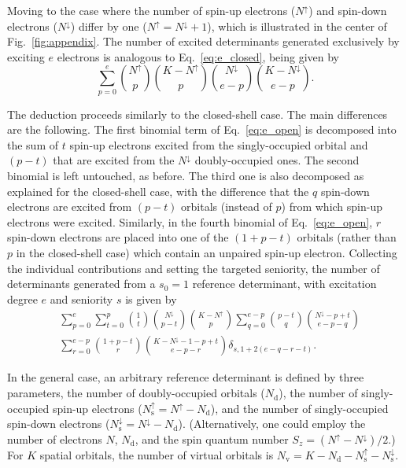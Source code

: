 \documentclass[aip,jcp,reprint,noshowkeys,superscriptaddress]{revtex4-1}
\newcommand{\Na}{N^{\uparrow}}
\newcommand{\Nb}{N^{\downarrow}}
\newcommand{\Nd}{N_\text{d}}
\newcommand{\Nv}{N_\text{v}}
\newcommand{\Nas}{N_\text{s}^{\uparrow}}
\newcommand{\Nbs}{N_\text{s}^{\downarrow}}
\newcommand{\Ndet}{N_\text{det}}
\begin{document}
Moving to the case where the number of spin-up electrons ($\Na$) and spin-down electrons ($\Nb$) differ by one ($\Na=\Nb+1$), which is illustrated in the center of Fig.~\ref{fig:appendix}.
The number of excited determinants generated exclusively by exciting $e$ electrons %
is analogous to Eq.~\eqref{eq:e_closed}, being given by
\begin{equation}
\sum_{p=0}^{e} 
\binom{\Na}{p} \binom{K-\Na}{p} \binom{\Nb}{e-p} \binom{K-\Nb}{e-p}.
\label{eq:e_open}
\end{equation}

The deduction proceeds similarly to the closed-shell case. 
The main differences are the following.
The first binomial term of Eq.~\eqref{eq:e_open} is decomposed into the sum of $t$ spin-up electrons excited from the singly-occupied orbital and $(p-t)$ that are excited from the $\Nb$ doubly-occupied ones.
The second binomial is left untouched, as before.
The third one is also decomposed as explained for the closed-shell case, with the difference that the $q$ spin-down electrons are excited from $(p-t)$ orbitals (instead of $p$) 
from which spin-up electrons were excited. 
Similarly, in the fourth binomial of Eq.~\eqref{eq:e_open}, $r$ spin-down electrons are placed into one of the $(1+p-t)$ orbitals (rather than $p$ in the closed-shell case) which contain an unpaired spin-up electron.
Collecting the individual contributions and setting the targeted seniority,
the number of determinants generated from a $s_0=1$ reference determinant, with excitation degree $e$ and seniority $s$ is given by
\begin{equation}
\begin{split}
	& \sum_{p=0}^{e} 
	\sum_{t=0}^{p} \binom{1}{t} \binom{\Nb}{p-t} 
	\binom{K-\Na}{p} 
	\sum_{q=0}^{e-p} \binom{p-t}{q} \binom{\Nb-p+t}{e-p-q} \\
	& \sum_{r=0}^{e-p} \binom{1+p-t}{r} \binom{K-\Nb-1-p+t}{e-p-r}
 	\delta_{s,1+2(e-q-r-t)}.
\label{eq:det_2}
\end{split}
\end{equation}

In the general case, an arbitrary reference determinant is defined by three parameters, the number of doubly-occupied orbitals ($\Nd$),
the number of singly-occupied spin-up electrons ($\Nas = \Na - \Nd$),
and the number of singly-occupied spin-down electrons ($\Nbs = \Nb - \Nd$).
(Alternatively, one could employ the number of electrons $N$, $\Nd$, and the spin quantum number $S_z = (\Na-\Nb)/2$.)
For $K$ spatial orbitals, the number of virtual orbitals is $\Nv = K - \Nd - \Nas - \Nbs$.
\end{document}
